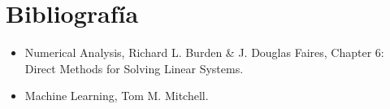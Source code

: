 \section{Bibliografía}

\begin{itemize}
 \item Numerical Analysis, Richard L. Burden \& J. Douglas Faires, Chapter 6: Direct Methods for Solving Linear Systems.
\item Machine Learning, Tom M. Mitchell.
\end{itemize}
